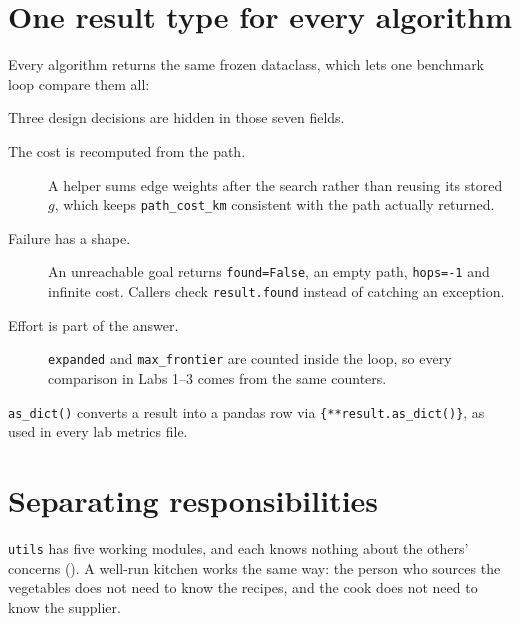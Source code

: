 \section{One result type for every algorithm}

Every algorithm returns the same frozen dataclass, which lets one benchmark loop compare them all:



Three design decisions are hidden in those seven fields.

\begin{description}
  \item[The cost is recomputed from the path.] A helper sums edge weights after the search rather than reusing its stored $g$, which keeps \texttt{path\_cost\_km} consistent with the path actually returned.
  \item[Failure has a shape.] An unreachable goal returns \texttt{found=False}, an empty path, \texttt{hops=-1} and infinite cost. Callers check \texttt{result.found} instead of catching an exception.
  \item[Effort is part of the answer.] \texttt{expanded} and \texttt{max\_frontier} are counted inside the loop, so every comparison in Labs 1--3 comes from the same counters.
\end{description}

\texttt{as\_dict()} converts a result into a pandas row via \texttt{\{**result.as\_dict()\}}, as used in every lab metrics file.

\section{Separating responsibilities}

\texttt{utils} has five working modules, and each knows nothing about the others' concerns (). A well-run kitchen works the same way: the person who sources the vegetables does not need to know the recipes, and the cook does not need to know the supplier.

